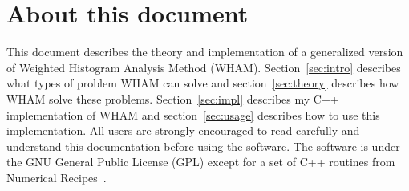 \section{About this document}
This document describes the theory and implementation of a generalized version
of Weighted Histogram Analysis Method (WHAM).  Section~\ref{sec:intro}
describes what types of problem WHAM can solve and section~\ref{sec:theory}
describes how WHAM solve these problems.  Section~\ref{sec:impl} describes my
C++ implementation of WHAM and section~\ref{sec:usage} describes how to use
this implementation.  All users are strongly encouraged to read carefully and
understand this documentation before using the software. The software is under
the GNU General Public License (GPL) except for a set of C++ routines from
Numerical Recipes~\cite{NumRec2007}.
